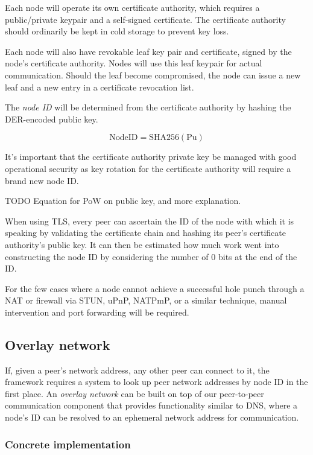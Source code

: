 \documentclass[a4paper,10pt]{article} \usepackage[utf8]{inputenc}
\newcommand{\todo}[1]{{\color{red} TODO #1 }}
\begin{document}
Each node will operate its own certificate authority, which requires a
public/private keypair and a self-signed certificate. The certificate authority
should ordinarily be kept in cold storage to prevent key loss.

Each node will also have revokable leaf key pair and certificate, signed by
the node's certificate authority. Nodes will use this leaf keypair for actual
communication. Should the leaf become compromised, the node can issue a new
leaf and a new entry in a certificate revocation list.

The {\em node ID} will be determined from the certificate authority
by hashing the DER-encoded public key.

\begin{equation}
\text{NodeID} = \text{SHA256}(\text{Pu})
\end{equation}

It's important that the certificate authority private key be managed with good
operational security as key rotation for the certificate authority will require
a brand new node ID.

\todo {Equation for PoW on public key, and more explanation.}

When using TLS, every peer can ascertain the ID of the node with which it is
speaking by validating the certificate chain and hashing its peer's
certificate authority's public key. It can then be estimated how much work went
into constructing the node ID by considering the number of 0 bits at the end of
the ID.

For the few cases where a node cannot achieve a successful hole punch through a
NAT or firewall via STUN, uPnP, NATPmP, or a similar technique, manual
intervention and port forwarding will be required.

\subsection{Overlay network}

If, given a peer's network address, any other peer can connect to it, the
framework requires a system to look up peer network addresses by node ID in the
first place. An {\em overlay network} can be built on top of our peer-to-peer
communication component that provides functionality similar to DNS, where a
node's ID can be resolved to an ephemeral network address for communication.

\subsubsection{Concrete implementation}
\end{document}
